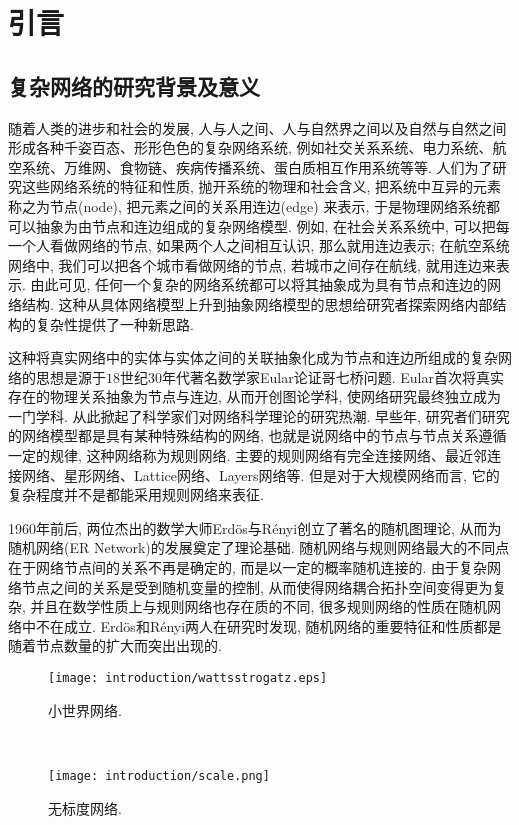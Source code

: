 \chapter{引言}\label{chap:introduction}


\section{复杂网络的研究背景及意义}

随着人类的进步和社会的发展, 人与人之间、人与自然界之间以及自然与自然之间形成各种千姿百态、形形色色的复杂网络系统, 例如社交关系系统、电力系统、航空系统、万维网、食物链、疾病传播系统、蛋白质相互作用系统等等. 人们为了研究这些网络系统的特征和性质, 抛开系统的物理和社会含义, 把系统中互异的元素称之为节点(node), 把元素之间的关系用连边(edge) 来表示, 于是物理网络系统都可以抽象为由节点和连边组成的复杂网络模型. 例如, 在社会关系系统中, 可以把每一个人看做网络的节点, 如果两个人之间相互认识, 那么就用连边表示; 在航空系统网络中, 我们可以把各个城市看做网络的节点, 若城市之间存在航线, 就用连边来表示. 由此可见, 任何一个复杂的网络系统都可以将其抽象成为具有节点和连边的网络结构. 这种从具体网络模型上升到抽象网络模型的思想给研究者探索网络内部结构的复杂性提供了一种新思路.

这种将真实网络中的实体与实体之间的关联抽象化成为节点和连边所组成的复杂网络的思想是源于$18$世纪$30$年代著名数学家Eular论证哥七桥问题. Eular首次将真实存在的物理关系抽象为节点与连边, 从而开创图论学科, 使网络研究最终独立成为一门学科. 从此掀起了科学家们对网络科学理论的研究热潮. 早些年, 研究者们研究的网络模型都是具有某种特殊结构的网络, 也就是说网络中的节点与节点关系遵循一定的规律, 这种网络称为规则网络. 主要的规则网络有完全连接网络、最近邻连接网络、星形网络、Lattice网络、Layers网络等. 但是对于大规模网络而言, 它的复杂程度并不是都能采用规则网络来表征.

1960年前后, 两位杰出的数学大师Erdös与Rényi创立了著名的随机图理论, 从而为随机网络(ER Network)的发展奠定了理论基础. 随机网络与规则网络最大的不同点在于网络节点间的关系不再是确定的, 而是以一定的概率随机连接的. 由于复杂网络节点之间的关系是受到随机变量的控制, 从而使得网络耦合拓扑空间变得更为复杂, 并且在数学性质上与规则网络也存在质的不同, 很多规则网络的性质在随机网络中不在成立. Erdös和Rényi两人在研究时发现, 随机网络的重要特征和性质都是随着节点数量的扩大而突出出现的.

\begin{figure}[htb]
\begin{minipage}[t]{0.48\linewidth}
\centering
\texttt{[image: introduction/wattsstrogatz.eps]}
\caption{小世界网络.}\label{smallworld}
\end{minipage}~~
\begin{minipage}[t]{0.48\linewidth}
\centering
\texttt{[image: introduction/scale.png]}
\caption{无标度网络.}\label{scalefree}
\end{minipage}
\end{figure}


